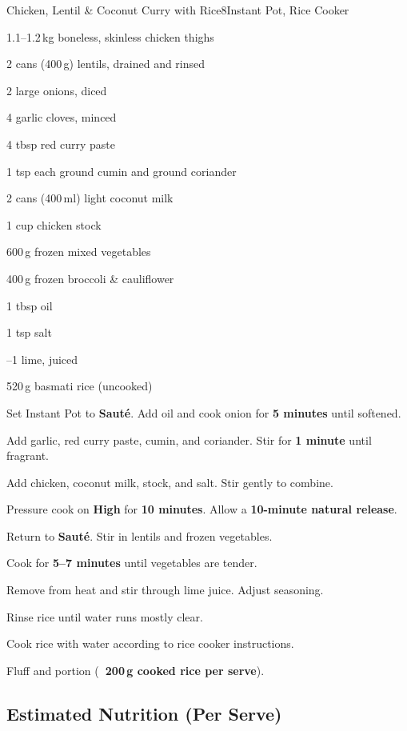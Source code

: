 \begin{recipe}{Chicken, Lentil \& Coconut Curry with Rice}{8}{Instant Pot, Rice Cooker}

\begin{ingredients}
  \item 1.1--1.2\,kg boneless, skinless chicken thighs
  \item 2 cans (400\,g) lentils, drained and rinsed
  \item 2 large onions, diced
  \item 4 garlic cloves, minced
  \item 4 tbsp red curry paste
  \item 1 tsp each ground cumin and ground coriander

  \item 2 cans (400\,ml) light coconut milk
  \item 1 cup chicken stock
  \item 600\,g frozen mixed vegetables
  \item 400\,g frozen broccoli \& cauliflower
  \item 1 tbsp oil
  \item 1 tsp salt
  \item {}--1 lime, juiced
  \item 520\,g basmati rice (uncooked)
\end{ingredients}

\begin{method}
  \item Set Instant Pot to \textbf{Sauté}. Add oil and cook onion for \textbf{5 minutes} until softened.
  \item Add garlic, red curry paste, cumin, and coriander. Stir for \textbf{1 minute} until fragrant.
  \item Add chicken, coconut milk, stock, and salt. Stir gently to combine.
  \item Pressure cook on \textbf{High} for \textbf{10 minutes}. Allow a \textbf{10-minute natural release}.
  \item Return to \textbf{Sauté}. Stir in lentils and frozen vegetables.
  \item Cook for \textbf{5--7 minutes} until vegetables are tender.
  \item Remove from heat and stir through lime juice. Adjust seasoning.
\end{method}

\begin{method}
  \item Rinse rice until water runs mostly clear.
  \item Cook rice with water according to rice cooker instructions.
  \item Fluff and portion (\textbf{~200\,g cooked rice per serve}).
\end{method}

\subsection*{Estimated Nutrition (Per Serve)}

\end{recipe}
